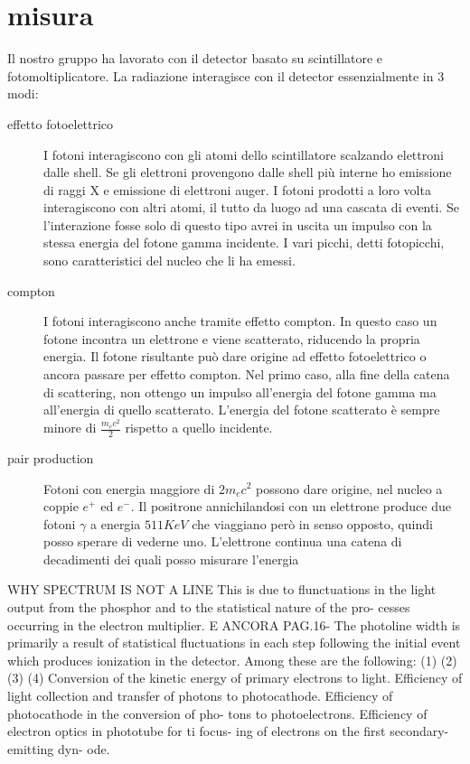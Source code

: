 \documentclass[11pt,a4paper]{article}
\begin{document}
\section{misura}
Il nostro gruppo ha lavorato con il detector basato su scintillatore e fotomoltiplicatore. La radiazione interagisce con il detector essenzialmente in 3 modi:
\begin{description}
  \item[effetto fotoelettrico] I fotoni interagiscono con gli atomi dello scintillatore scalzando elettroni dalle shell. Se gli elettroni provengono dalle shell più interne ho emissione di raggi X e emissione di elettroni auger. I fotoni prodotti a loro volta interagiscono con altri atomi, il tutto da luogo ad una cascata di eventi. Se l'interazione fosse solo di questo tipo avrei in uscita un impulso con la stessa energia del fotone gamma incidente. I vari picchi, detti fotopicchi, sono caratteristici del nucleo che li ha emessi.
  \item[compton] I fotoni interagiscono anche tramite effetto compton. In questo caso un fotone incontra un elettrone e viene scatterato, riducendo la propria energia. Il fotone risultante può dare origine ad effetto fotoelettrico o ancora passare per effetto compton. Nel primo caso, alla fine della catena di scattering, non ottengo un impulso all'energia del fotone gamma ma all'energia di quello scatterato. L'energia del fotone scatterato è sempre minore di $\frac{m_e c^2}{2}$ rispetto a quello incidente.
  \item[pair production] Fotoni con energia maggiore di $2 m_e c^2$ possono dare origine, nel nucleo a coppie $e^+$ ed $e^-$. Il positrone annichilandosi con un elettrone produce due fotoni $\gamma$ a energia $511KeV$ che viaggiano però in senso opposto, quindi posso sperare di vederne uno. L'elettrone continua una catena di decadimenti dei quali posso misurare l'energia
\end{description}

WHY SPECTRUM IS NOT A LINE
This is due to flunctuations in the light
output from the phosphor and to the statistical nature of the pro-
cesses occurring in the electron multiplier.
E ANCORA  PAG.16-
The photoline width is primarily a result of statistical fluctuations
in each step following the initial event which produces ionization
in the detector. Among these are the following:
(1)
(2)
(3)
(4)
Conversion of the kinetic energy of primary electrons
to light.
Efficiency of light collection and transfer of photons
to photocathode.
Efficiency of photocathode in the conversion of pho-
tons to photoelectrons.
Efficiency of electron optics in phototube for ti focus-
ing of electrons on the first secondary-emitting dyn-
ode.
\end{document}
